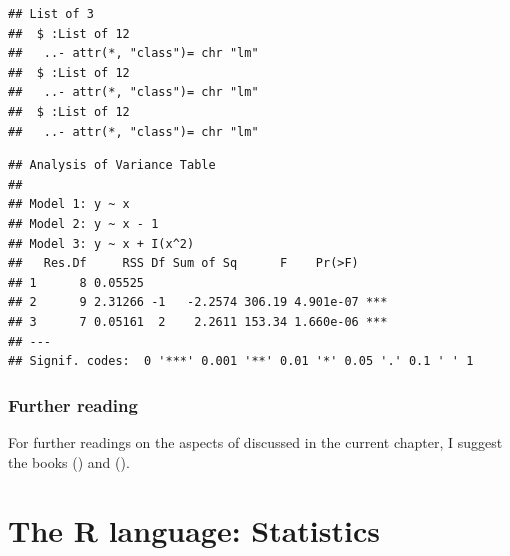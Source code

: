 \documentclass[krantz2]{krantz}\usepackage{knitr}
\begin{document}
\begin{knitrout}\footnotesize
{}\color{fgcolor}\begin{kframe}
\begin{alltt}
 \hlkwb{<-} \hlstd{()}
 \hlkwb{<-}  \hlopt{~}  \hlopt{~}  \hlopt{-}  \hlopt{~}  \hlopt{+} \hlopt{^}\hlstd{))}
   \hlstd{(} 
    \hlkwb{<-}   
   \hlstd{\}}
  \hlstd{=} \hlstd{)}
\end{alltt}
\begin{verbatim}
## List of 3
##  $ :List of 12
##   ..- attr(*, "class")= chr "lm"
##  $ :List of 12
##   ..- attr(*, "class")= chr "lm"
##  $ :List of 12
##   ..- attr(*, "class")= chr "lm"
\end{verbatim}
\begin{alltt}
\end{alltt}
\begin{verbatim}
## Analysis of Variance Table
## 
## Model 1: y ~ x
## Model 2: y ~ x - 1
## Model 3: y ~ x + I(x^2)
##   Res.Df     RSS Df Sum of Sq      F    Pr(>F)    
## 1      8 0.05525                                  
## 2      9 2.31266 -1   -2.2574 306.19 4.901e-07 ***
## 3      7 0.05161  2    2.2611 153.34 1.660e-06 ***
## ---
## Signif. codes:  0 '***' 0.001 '**' 0.01 '*' 0.05 '.' 0.1 ' ' 1
\end{verbatim}
\end{kframe}
\end{knitrout}

\subsection{Further reading}
For further readings on the aspects of \Rlang discussed in the current chapter, I suggest the books  (\citeauthor{Matloff2011}) and  (\citeauthor{Wickham2019}).




\chapter{The R language: Statistics}\label{chap:R:statistics}
\end{document}
